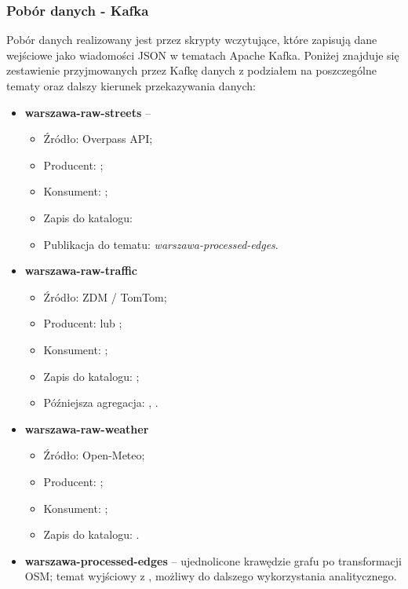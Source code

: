 \documentclass[12pt]{article}
\begin{document}
\subsubsection{Pobór danych - Kafka}
Pobór danych realizowany jest przez skrypty wczytujące, które zapisują dane wejściowe jako
wiadomości JSON w tematach Apache Kafka. Poniżej znajduje się zestawienie przyjmowanych przez Kafkę danych z podziałem 
na poszczególne tematy oraz dalszy kierunek przekazywania danych:
\begin{itemize}
    \item \textbf{warszawa-raw-streets} -- 
    \begin{itemize} 
        \item Źródło: Overpass API;
        \item Producent: ;
        \item Konsument: ; 
        \item Zapis do katalogu:  
        \item Publikacja do tematu: \textit{warszawa-processed-edges}.
    \end{itemize}
    \item \textbf{warszawa-raw-traffic}
    \begin{itemize} 
        \item Źródło: ZDM / TomTom;
        \item Producent:  lub ;
        \item Konsument: ; 
        \item Zapis do katalogu: ;
        \item Późniejsza agregacja: , .
    \end{itemize} 
    \item \textbf{warszawa-raw-weather}
    \begin{itemize} 
        \item Źródło: Open-Meteo;
        \item Producent: ;
        \item Konsument: ; 
        \item Zapis do katalogu: .
    \end{itemize} 
    \item \textbf{warszawa-processed-edges} -- ujednolicone krawędzie grafu po transformacji OSM;
    temat wyjściowy z , możliwy do dalszego
    wykorzystania analitycznego.
\end{itemize}
\end{document}
